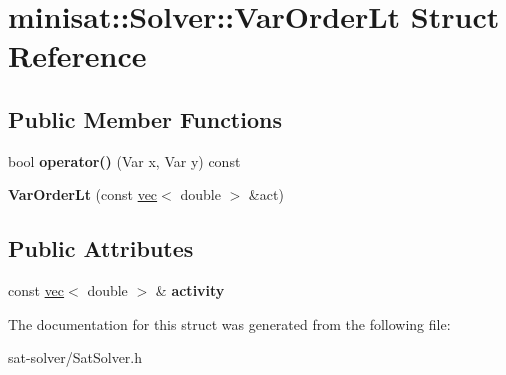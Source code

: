 \hypertarget{structminisat_1_1Solver_1_1VarOrderLt}{\section{minisat\-:\-:\-Solver\-:\-:\-Var\-Order\-Lt \-Struct \-Reference}
\label{structminisat_1_1Solver_1_1VarOrderLt}
}
\subsection*{\-Public \-Member \-Functions}
\begin{DoxyCompactItemize}
\item 
\hypertarget{structminisat_1_1Solver_1_1VarOrderLt_a4630a5022ac3bc3f94539ac8763a2f7a}{bool {\bfseries operator()} (\-Var x, \-Var y) const }\label{structminisat_1_1Solver_1_1VarOrderLt_a4630a5022ac3bc3f94539ac8763a2f7a}

\item 
\hypertarget{structminisat_1_1Solver_1_1VarOrderLt_af732e389eedbf9aa3c5a2125884d80e7}{{\bfseries \-Var\-Order\-Lt} (const \hyperlink{classvec}{vec}$<$ double $>$ \&act)}\label{structminisat_1_1Solver_1_1VarOrderLt_af732e389eedbf9aa3c5a2125884d80e7}

\end{DoxyCompactItemize}
\subsection*{\-Public \-Attributes}
\begin{DoxyCompactItemize}
\item 
\hypertarget{structminisat_1_1Solver_1_1VarOrderLt_a93b95025ebbb119c071e6a12324d8a7b}{const \hyperlink{classvec}{vec}$<$ double $>$ \& {\bfseries activity}}\label{structminisat_1_1Solver_1_1VarOrderLt_a93b95025ebbb119c071e6a12324d8a7b}

\end{DoxyCompactItemize}


\-The documentation for this struct was generated from the following file\-:\begin{DoxyCompactItemize}
\item 
sat-\/solver/\-Sat\-Solver.\-h\end{DoxyCompactItemize}

